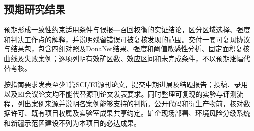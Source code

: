 \subsection{预期研究结果}
预期形成一致性约束适用条件与误报—召回权衡的实证结论，区分区域选择、强度和判决工作点的解释，并说明残留错误可被复核发现的范围。交付一套可复现协议与结果包，包含四组对照及DonaNet结果、强度和阈值敏感性分析、固定面积复核曲线及失败案例；逐项列明有效矿区数、效应区间和未完成条件，不以预期涨幅代替考核。

按指南要求发表至少1篇SCI/EI源刊论文，提交中期进展及结题报告；投稿、录用以及EI会议论文均不能代替源刊论文发表要求。同时整理可复现的实验与评测流程，列出案例来源并说明各案例能够支持的判断。公开代码和衍生产物前，核对数据许可、既有项目权属及实验室成果共享约定。矿企现场部署、环境风险分级系统和新疆示范区建设不列为本项目的必达成果。
